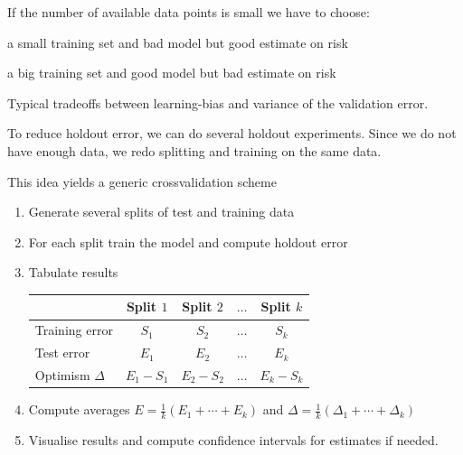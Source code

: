 \documentclass[landscape,footrule]{foils}
\begin{document}
If the number of available data points is small we have to choose:
\begin{triangles}
\item a small training set and bad model but good estimate on risk
\item a big training set and good model but bad estimate on risk
\end{triangles}


\vspace*{-.5cm}
Typical tradeoffs between learning-bias and variance of the validation error.   


\enlargethispage{0.7cm}

To reduce holdout error, we can do several holdout experiments. 
Since we do not have enough data, we redo splitting and training on the same data. 

This idea yields a generic crossvalidation scheme
\begin{enumerate}
\item Generate several splits of test and training data
\item For each split train the model and compute holdout error
\item Tabulate results\vspace*{2ex}
\begin{center}
\begin{tabular}{|l|c|c|c|c|}
\hline
 & Split $1$ & Split $2$ & $\ldots$ & Split $k$\\
 \hline
 Training error & $S_1$ & $S_2$ & $\ldots$ & $S_k$\\
 Test error     & $E_1$ & $E_2$ & $\ldots$ & $E_k$\\
\hline
 Optimism $\Delta$    & $E_1-S_1$ & $E_2-S_2$ & $\ldots$ & $E_k-S_k$\\
 \cline{2-5}
\hline
\end{tabular}
\end{center}
\vspace*{2ex}
\item Compute averages $E=\frac{1}{k}(E_1+\cdots+E_k)$ and $\Delta=\frac{1}{k}(\Delta_1+\cdots+\Delta_k)$
\item Visualise results and compute confidence intervals for estimates if needed. 
\end{enumerate}
\end{document}
